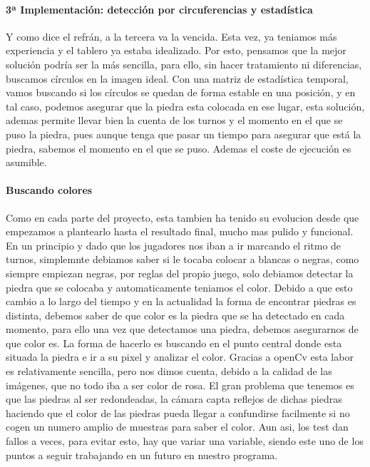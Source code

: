 \documentclass[12pt,a4paper]{report}
\begin{document}
\paragraph{3ª Implementación: detección por circuferencias y estadística}
Y como dice el refrán, a la tercera va la vencida. Esta vez, ya teniamos más
experiencia y el tablero ya estaba idealizado. Por esto, pensamos que la mejor
solución podría ser la más sencilla, para ello, sin hacer tratamiento ni
diferencias, buscamos círculos en la imagen ideal. Con una matriz de estadística
temporal, vamos buscando si los círculos se quedan de forma estable en una
posición, y en tal caso, podemos asegurar que la piedra esta colocada en ese
lugar, esta solución, ademas permite llevar bien la cuenta de los turnos y el
momento en el que se puso la piedra, pues aunque tenga que pasar un tiempo para
asegurar que está la piedra, sabemos el momento en el que se puso. Ademas el
coste de ejecución es asumible.

\paragraph{Buscando colores}

Como en cada parte del proyecto, esta tambien ha tenido su evolucion desde que
empezamos a plantearlo hasta el resultado final, mucho mas pulido y funcional.
En un principio y dado que los jugadores nos iban a ir marcando el ritmo de
turnos, simplemnte debiamos saber si le tocaba colocar a blancas o negras, como
siempre empiezan negras, por reglas del propio juego, solo debiamos detectar la
piedra que se colocaba y automaticamente teniamos el color.  Debido a que esto
cambio a lo largo del tiempo y en la actualidad la forma de encontrar piedras es
distinta, debemos saber de que color es la piedra que se ha detectado en cada
momento, para ello una vez que detectamos una piedra, debemos asegurarnos de que
color es. La forma de hacerlo es buscando en el punto central donde esta situada
la piedra e ir a su pixel y analizar el color. Gracias a openCv esta labor es
relativamente sencilla, pero nos dimos cuenta, debido a la calidad de las
imágenes, que no todo iba a ser color de rosa. El gran problema que tenemos es
que las piedras al ser redondeadas, la cámara capta reflejos de dichas piedras
haciendo que el color de las piedras pueda llegar a confundirse facilmente si no
cogen un numero amplio de muestras para saber el color. Aun asi, los test dan
fallos a veces, para evitar esto, hay que variar una variable, siendo este uno
de los puntos a seguir trabajando en un futuro en nuestro programa.
\end{document}
